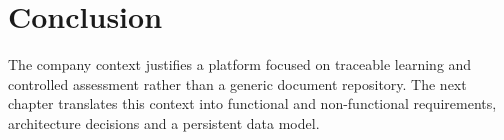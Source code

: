 \section*{Conclusion}
The company context justifies a platform focused on traceable learning and
controlled assessment rather than a generic document repository. The next
chapter translates this context into functional and non-functional
requirements, architecture decisions and a persistent data model.
